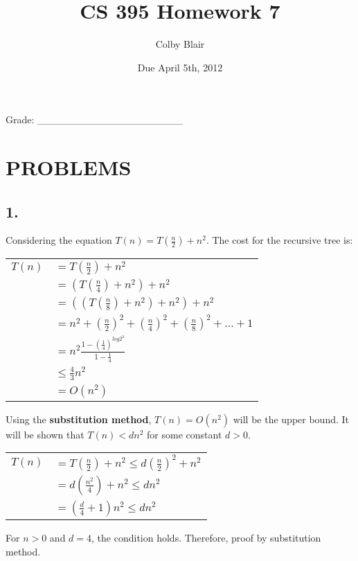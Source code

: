 \documentclass[11pt,letterpaper]{article}
\date{Due April 5th, 2012}
\title{CS 395 Homework 7}
\author{Colby Blair}
\begin{document}
\maketitle

\begin{center}

Grade: \_\_\_\_\_\_\_\_\_\_\_\_\_\_\_\_\_\_\_\_
\end{center}

\thispagestyle{empty}

\pagebreak


\section*{PROBLEMS}

\subsection*{1.}
Considering the equation $T(n) = T(\frac{n}{2}) + n^2$. The cost for the recursive tree is:

\begin{tabular}{r l}
	$T(n)$		& $ = T(\frac{n}{2}) + n^2 $ \\
				& $ = (T(\frac{n}{4}) + n^2) + n^2$ \\
				& $ = ( (T(\frac{n}{8}) + n^2) + n^2) + n^2 $ \\
				& $ = n^2 + (\frac{n}{2})^2 + (\frac{n}{4})^2 + (\frac{n}{8})^2 + \ldots + 1$ \\
				& $ = n^2 \frac{ 1 - (\frac{1}{4})^{log 2^2} }{ 1 - \frac{1}{4} } $ \\
				& $ \leq \frac{4}{3}n^2 $\\
				& $ = O(n^2) $ \\
\end{tabular}

Using the \textbf{substitution method}, $T(n) = O(n^2)$ will be the upper bound. It will be shown that 
$T(n) < dn^2$ for some constant $d > 0$. 

\begin{tabular}{r l}
	$T(n)$		& $ = T(\frac{n}{2}) + n^2 \leq d(\frac{n}{2})^2 + n^2$ \\
				& $ = d(\frac{n^2}{4}) + n^2 \leq dn^2 $ \\
				& $ = (\frac{d}{4} + 1)n^2 \leq dn^2 $ \\
\end{tabular}

For $n >0$ and $d=4$, the condition holds. Therefore, proof by substitution method.
\end{document}
